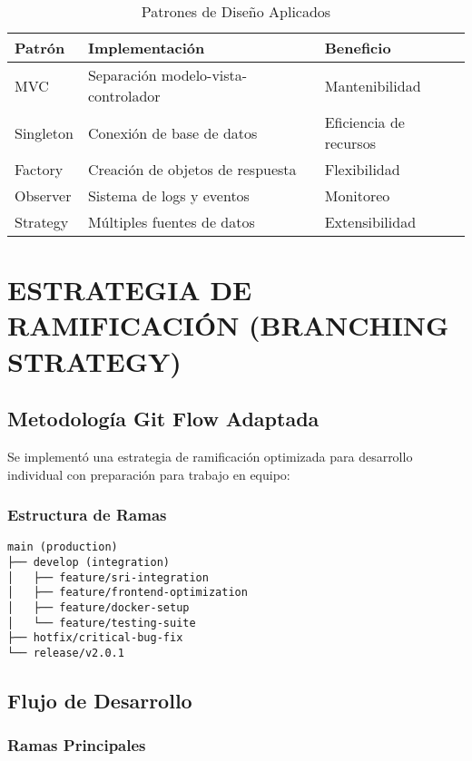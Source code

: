 \documentclass[12pt,a4paper]{article}
\begin{document}
\begin{table}[h]
\centering
\begin{tabularx}{\textwidth}{|l|X|X|}
\hline
\textbf{Patrón} & \textbf{Implementación} & \textbf{Beneficio} \\
\hline
MVC & Separación modelo-vista-controlador & Mantenibilidad \\
\hline
Singleton & Conexión de base de datos & Eficiencia de recursos \\
\hline
Factory & Creación de objetos de respuesta & Flexibilidad \\
\hline
Observer & Sistema de logs y eventos & Monitoreo \\
\hline
Strategy & Múltiples fuentes de datos & Extensibilidad \\
\hline
\end{tabularx}
\caption{Patrones de Diseño Aplicados}
\end{table}

\section{ESTRATEGIA DE RAMIFICACIÓN (BRANCHING STRATEGY)}

\subsection{Metodología Git Flow Adaptada}

Se implementó una estrategia de ramificación optimizada para desarrollo individual con preparación para trabajo en equipo:

\subsubsection{Estructura de Ramas}

\begin{verbatim}
main (production)
├── develop (integration)
│   ├── feature/sri-integration
│   ├── feature/frontend-optimization
│   ├── feature/docker-setup
│   └── feature/testing-suite
├── hotfix/critical-bug-fix
└── release/v2.0.1
\end{verbatim}

\subsection{Flujo de Desarrollo}

\subsubsection{Ramas Principales}
\end{document}
